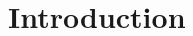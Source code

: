 \doublespacing %

\chapter{Introduction}
\label{ch1}

\begin{spacing}{1} %
\minitoc %
\end{spacing} %
\thesisspacing %



% 


% 


% 
